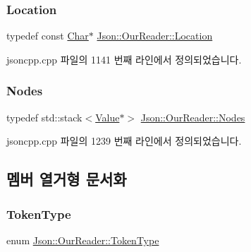\subsubsection{\texorpdfstring{Location}{Location}}
{\footnotesize\ttfamily typedef const \hyperlink{class_json_1_1_our_reader_a0cd0bab4caa66594ab843ccd5f9dc239}{Char}$\ast$ \hyperlink{class_json_1_1_our_reader_a1bdc7bbc52ba87cae6b19746f2ee0189}{Json\+::\+Our\+Reader\+::\+Location}}



jsoncpp.\+cpp 파일의 1141 번째 라인에서 정의되었습니다.

\mbox{\label{class_json_1_1_our_reader_a8480a5ef159cee3a090f96358414d8d3}} 
\subsubsection{\texorpdfstring{Nodes}{Nodes}}
{\footnotesize\ttfamily typedef std\+::stack$<$\hyperlink{class_json_1_1_value}{Value}$\ast$$>$ \hyperlink{class_json_1_1_our_reader_a8480a5ef159cee3a090f96358414d8d3}{Json\+::\+Our\+Reader\+::\+Nodes}\hspace{0.3cm}{\ttfamily [private]}}



jsoncpp.\+cpp 파일의 1239 번째 라인에서 정의되었습니다.



\subsection{멤버 열거형 문서화}
\mbox{\label{class_json_1_1_our_reader_a15116f7276ddf1e7a2cc3cbefa884dcc}} 
\subsubsection{\texorpdfstring{Token\+Type}{TokenType}}
{\footnotesize\ttfamily enum \hyperlink{class_json_1_1_our_reader_a15116f7276ddf1e7a2cc3cbefa884dcc}{Json\+::\+Our\+Reader\+::\+Token\+Type}\hspace{0.3cm}{\ttfamily [private]}}

